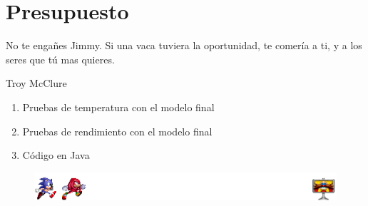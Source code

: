 \newpage

\thispagestyle{empty}
\mbox{}

\chapter{Presupuesto}

\label{ch:capitulo7.tex}

\begin{FraseCelebre}
	\begin{Frase}
		No te engañes Jimmy. Si una vaca tuviera la oportunidad, te comería a ti, y a los seres que tú mas quieres.
	\end{Frase}
	\begin{Fuente}
	 Troy McClure
	\end{Fuente}
\end{FraseCelebre}


\begin{enumerate}

\item Pruebas de temperatura con el modelo final
\item Pruebas de rendimiento con el modelo final
\item Código en Java


\end{enumerate}


\vspace{5mm} %
\vfill

\begin{figure}[H]
	\centering
	\includegraphics[width=150mm]{pics/theend.png}
\end{figure}